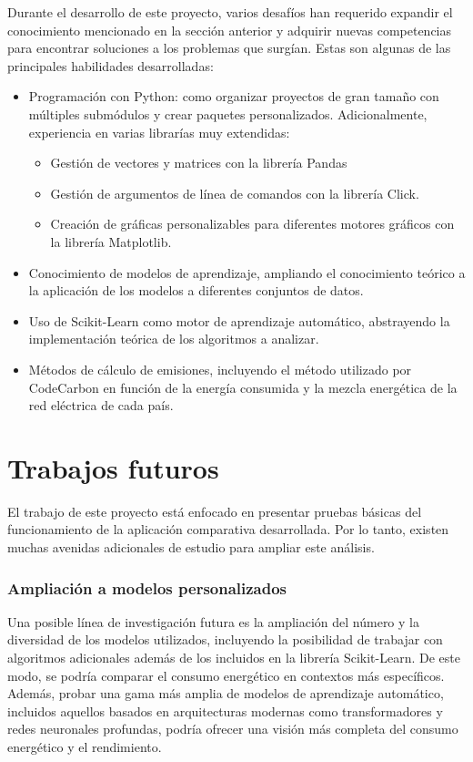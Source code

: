 Durante el desarrollo de este proyecto, varios desafíos han requerido expandir el conocimiento mencionado en la sección anterior y adquirir nuevas competencias para encontrar soluciones a los problemas que surgían. Estas son algunas de las principales habilidades desarrolladas:

\begin{itemize}
    \item Programación con Python: como organizar proyectos de gran tamaño con múltiples submódulos y crear paquetes personalizados. Adicionalmente, experiencia en varias librarías muy extendidas:
    \begin{itemize}
        \item Gestión de vectores y matrices con la librería Pandas
        \item Gestión de argumentos de línea de comandos con la librería Click.
        \item Creación de gráficas personalizables para diferentes motores gráficos con la librería Matplotlib.
    \end{itemize}
    \item Conocimiento de modelos de aprendizaje, ampliando el conocimiento teórico a la aplicación de los modelos a diferentes conjuntos de datos.
    \item Uso de Scikit-Learn como motor de aprendizaje automático, abstrayendo la implementación teórica de los algoritmos a analizar.
    \item Métodos de cálculo de emisiones, incluyendo el método utilizado por CodeCarbon en función de la energía consumida y la mezcla energética de la red eléctrica de cada país.
\end{itemize}


\section{Trabajos futuros}
\label{sec:trabajos_futuros}

El trabajo de este proyecto está enfocado en presentar pruebas básicas del funcionamiento de la aplicación comparativa desarrollada. Por lo tanto, existen muchas avenidas adicionales de estudio para ampliar este análisis. 

\subsubsection{Ampliación a modelos personalizados}
Una posible línea de investigación futura es la ampliación del número y la diversidad de los modelos utilizados, incluyendo la posibilidad de trabajar con algoritmos adicionales además de los incluidos en la librería Scikit-Learn. De este modo, se podría comparar el consumo energético en contextos más específicos. Además, probar una gama más amplia de modelos de aprendizaje automático, incluidos aquellos basados en arquitecturas modernas como transformadores y redes neuronales profundas, podría ofrecer una visión más completa del consumo energético y el rendimiento.

